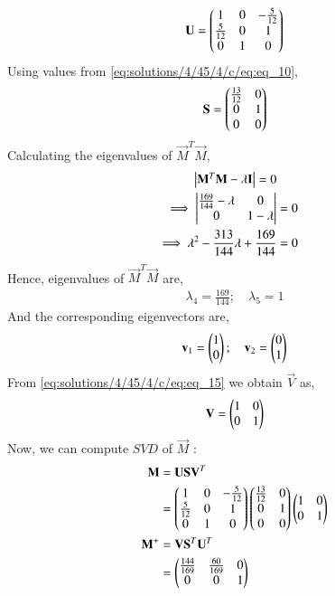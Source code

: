 \begin{align} \label{eq:solutions/4/45/4/c/eq:eq_13}
    \mathbf{U} = \begin{pmatrix}1 & 0 & -\frac{5}{12} \\ \frac{5}{12} & 0 & 1 \\ 0 & 1 & 0\end{pmatrix}
\end{align}
Using values from \eqref{eq:solutions/4/45/4/c/eq:eq_10},
\begin{align} \label{eq:solutions/4/45/4/c/eq:eq_14}
    \mathbf{S} = \begin{pmatrix}\frac{13}{12} & 0 \\ 0 & 1 \\ 0 & 0\end{pmatrix} 
\end{align}
Calculating the eigenvalues of $\vec{M}^T\vec{M}$,
\begin{align}
    \begin{vmatrix}\mathbf{M}^T\mathbf{M} - \lambda \mathbf{I}\end{vmatrix} = 0 \nonumber \\
    \implies \begin{vmatrix}\frac{169}{144}-\lambda & 0 \\ 0 & 1-\lambda\end{vmatrix} &= 0 \nonumber \\
    \implies \lambda^2 - \frac{313}{144}\lambda + \frac{169}{144} &= 0 \nonumber
\end{align}
Hence, eigenvalues of $\vec{M}^T\vec{M}$ are,
\begin{align}
    \lambda_4 = \frac{169}{144}; \quad \lambda_5 = 1 \nonumber
\end{align}
And the corresponding eigenvectors are,
\begin{align}
    \mathbf{v}_1 = \begin{pmatrix}1 \\ 0\end{pmatrix}; \quad 
    \mathbf{v}_2 = \begin{pmatrix}0 \\ 1\end{pmatrix} \label{eq:solutions/4/45/4/c/eq:eq_15}
\end{align}
From \eqref{eq:solutions/4/45/4/c/eq:eq_15} we obtain $\vec{V}$ as,
\begin{align} \label{eq:solutions/4/45/4/c/eq:eq_16}
    \mathbf{V} = \begin{pmatrix}1 & 0 \\ 0 & 1\end{pmatrix}
\end{align}
Now, we can compute $\textit{SVD}$ of $\vec{M}$ :
\begin{align}
	\label{eq:solutions/4/45/4/c/eq16}\vec{M} &= \vec{U}\Vec{S}\vec{V}^T\\
	\label{eq:solutions/4/45/4/c/eq17} &= \myvec{1 & 0 & -\frac{5}{12}\\ \frac{5}{12} & 0 & 1 \\0 & 1 & 0}\myvec{\frac{13}{12} & 0 \\0 & 1\\0 & 0} \myvec{1 & 0\\0 & 1}\\
	\label{eq:solutions/4/45/4/c/eq18}\vec{M}^{+} &= \vec{V}\Vec{S}^T\vec{U}^T\\
	\label{eq:solutions/4/45/4/c/eq20}&=\myvec{\frac{144}{169} & \frac{60}{169} & 0\\0 & 0 & 1}
\end{align}
